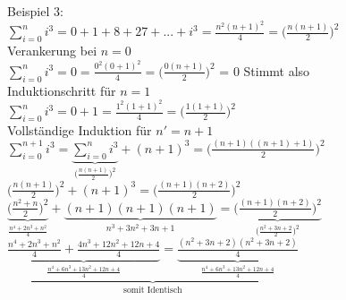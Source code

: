 \documentclass[a4paper]{scrartcl}
\begin{document}
\newpage
Beispiel 3: \\
$\sum\limits_{i=0}^n i^3 = 0 + 1 + 8 + 27 + ... + i^3 = \frac{n^2 (n+1)^2}{4} = \Big(\frac{n (n+1)}{2}\Big)^2$ \\ \newline
Verankerung bei $n=0$ \\
$\sum\limits_{i=0}^n i^3 = 0  = \frac{0^2 (0+1)^2}{4} = \Big(\frac{0 (n+1)}{2}\Big)^2$ = 0 Stimmt also \\ \newline
Induktionschritt für $n=1$ \\
$\sum\limits_{i=0}^n i^3 = 0 + 1  = \frac{1^2 (1+1)^2}{4} = \Big(\frac{1 (1+1)}{2}\Big)^2$ \\ \newline
Vollständige Induktion für $n'=n+1$ \\  \newline
$\sum\limits_{i=0}^{n+1} i^3 = \underbrace{\sum\limits_{i=0}^{n} i^3}_{ \Big(\frac{n (n+1)}{2}\Big)^2} +(n+1)^3 = \Big(\frac{(n+1) ((n+1)+1)}{2}\Big)^2$ \\ \newline
$ \Big(\frac{n (n+1)}{2}\Big)^2 +(n+1)^3 = \Big(\frac{(n+1) (n+2)}{2}\Big)^2$ \\ \newline
$ \underbrace{\Big(\frac{n^2+n}{2}\Big)^2}_{\frac{n^4+2n^3+n^2}{4}}  +\underbrace{(n+1)(n+1)(n+1)}_{n^3+3n^2+3n+1} = \underbrace{\Big(\frac{(n+1) (n+2)}{2}\Big)^2}_{\Big(\frac{n^2+3n+2}{2}\Big)^2}$ \\ \newline \newline
$\underbrace{\underbrace{\frac{n^4+2n^3+n^2}{4}+\frac{4n^3+12n^2+12n+4}{4}}_{\frac{n^4+6n^3+13n^2+12n+4}{4}} = \underbrace{\frac{(n^2+3n+2)(n^2+3n+2)}{4}}_{\frac{n^4 + 6n^3 + 13n^2 + 12n + 4}{4}}}_{\text{somit Identisch}}$ \\ \newline
\end{document}
